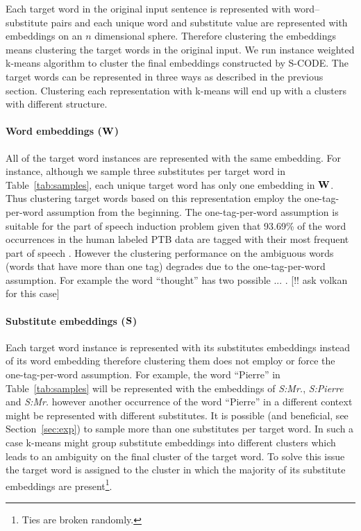 Each target word in the original input sentence is represented with
word--substitute pairs and each unique word and substitute value are
represented with embeddings on an $n$ dimensional sphere.  Therefore
clustering the embeddings means clustering the target words in the
original input.  We run instance weighted k-means algorithm to cluster
the final embeddings constructed by S-CODE.  The target words can be
represented in three ways as described in the previous section.
Clustering each representation with k-means will end up with a
clusters with different structure.

\paragraph{Word embeddings (${\bf W}$)} All of the target word instances
are represented with the same embedding.  For instance, although we
sample three substitutes per target word in Table~\ref{tab:samples},
each unique target word has only one embedding in ${\bf W}$.  Thus
clustering target words based on this representation employ the
one-tag-per-word assumption from the beginning.  The one-tag-per-word
assumption is suitable for the part of speech induction problem given
that 93.69\% of the word occurrences in the human labeled PTB data are
tagged with their most frequent part of speech
\cite{Toutanova:2003:FPT:1073445.1073478}.  However the clustering
performance on the ambiguous words (words that have more than one tag)
degrades due to the one-tag-per-word assumption.  For example the word
``thought'' has two possible ... . [!! ask volkan for this case]

\paragraph{Substitute embeddings (${\bf S}$)} 
Each target word instance is represented with its substitutes
embeddings instead of its word embedding therefore clustering them
does not employ or force the one-tag-per-word assumption.  For
example, the word ``Pierre'' in Table~\ref{tab:samples} will be
represented with the embeddings of {\it S:Mr.}, {\it S:Pierre} and
{\it S:Mr.}  however another occurrence of the word ``Pierre'' in a
different context might be represented with different substitutes.  It
is possible (and beneficial, see Section~\ref{sec:exp}) to sample more
than one substitutes per target word.  In such a case k-means might
group substitute embeddings into different clusters which leads to an
ambiguity on the final cluster of the target word.  To solve this
issue the target word is assigned to the cluster in which the majority
of its substitute embeddings are present\footnote{Ties are broken
  randomly.}.

